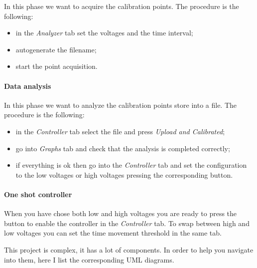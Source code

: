 In this phase we want to acquire the calibration points. The procedure
is the following:

\begin{itemize}
      \itemsep1pt\parskip0pt
      \item
            in the \emph{Analyzer} tab set the voltages and the time interval;
      \item
            autogenerate the filename;
      \item
            start the point acquisition.
\end{itemize}

\paragraph{Data analysis}

In this phase we want to analyze the calibration points store into a
file. The procedure is the following:

\begin{itemize}
      \itemsep1pt\parskip0pt
      \item
            in the \emph{Controller} tab select the file and press \emph{Upload
                  and Calibrated};
      \item
            go into \emph{Graphs} tab and check that the analysis is completed
            correctly;
      \item
            if everything is ok then go into the \emph{Controller} tab and set the
            configuration to the low voltages or high voltages pressing the
            corresponding button.
\end{itemize}

\paragraph{One shot controller}

When you have chose both low and high voltages you are ready to press
the button to enable the controller in the \emph{Controller} tab. To
swap between high and low voltages you can set the time movement
threshold in the same tab.


This project is complex, it has a lot of components. In order to help
you navigate into them, here I list the corresponding UML diagrams.



